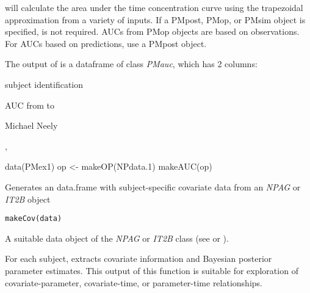 \documentclass[a4paper]{book}
\begin{document}
%
\begin{Details}\relax
{} will calculate the area under the time concentration curve using the
trapezoidal approximation from a variety of inputs.  If a PMpost, PMop, or PMsim object is specified, 
 is not required.  AUCs from PMop objects are based on observations.
For AUCs based on predictions, use a PMpost object.
\end{Details}
%
\begin{Value}
The output of  is a dataframe of class \emph{PMauc},
which has 2 columns:
\begin{ldescription}
\item[\code{id }] subject identification
\item[\code{tau }] AUC from  to 
\end{ldescription}
\end{Value}
%
\begin{Author}\relax
Michael Neely
\end{Author}
%
\begin{SeeAlso}\relax
{}, 
\end{SeeAlso}
%
\begin{Examples}
\begin{ExampleCode}
data(PMex1)
op <- makeOP(NPdata.1)
makeAUC(op)
\end{ExampleCode}
\end{Examples}
%
\begin{Description}\relax
Generates an data.frame with subject-specific covariate data from an \emph{NPAG} or \emph{IT2B} object
\end{Description}
%
\begin{Usage}
\begin{verbatim}
makeCov(data)
\end{verbatim}
\end{Usage}
%
\begin{Arguments}
\begin{ldescription}
\item[\code{data}] A suitable data object of the \emph{NPAG} or \emph{IT2B} class (see  or ).
\end{ldescription}
\end{Arguments}
%
\begin{Details}\relax
For each subject,  extracts covariate information and Bayesian posterior parameter estimates.
This output of this function is suitable for exploration of covariate-parameter, covariate-time, or parameter-time relationships.
\end{Details}
\end{document}
